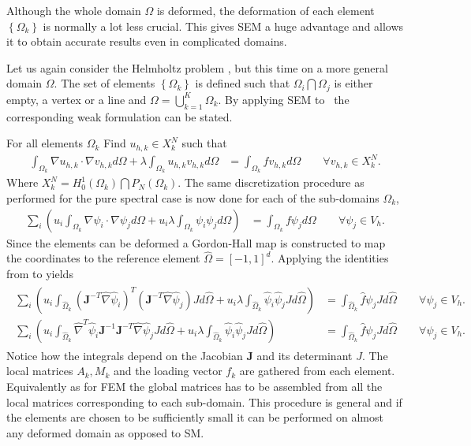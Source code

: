 Although the whole domain $\Omega$ is deformed, the deformation of each
element $\left\{ \Omega_k \right\}$ is normally a lot less crucial. This gives SEM a huge advantage and allows it to 
obtain accurate results even in complicated domains.

Let us again consider the Helmholtz problem , but this time 
on a more general domain $\Omega$. The set of elements $\left\{ \Omega_k \right\}$
is defined such that $\Omega_i\bigcap\Omega_j$ is either empty, a vertex or a line and 
$\Omega = \bigcup^K_{k=1}\Omega_k$.
By applying SEM to~ the corresponding weak formulation can be stated.

For all elements $\Omega_k$ Find $u_{h,k}\in X^N_k$  such that
%
\begin{align}
    \int_{\Omega_k}\nabla u_{h,k} \cdot \nabla v_{h,k} d \Omega
    + \lambda \int_{\Omega_k} u_{h,k} v_{h,k} d \Omega 
    &= \int_{\Omega_k}f v_{h,k}d \Omega \qquad \forall v_{h,k} \in X_k^N.
    \label{eq:HelmholtzweakSEM}
\end{align}
%
Where $X^N_k =  H_0^1(\Omega_k)\bigcap P_N(\Omega_k)$. The same discretization 
procedure as performed for the pure spectral case is now done for each of the 
sub-domains $\Omega_k$,
%
\begin{align}
    \sum_i\left(  u_i\int_{\Omega_k}\nabla \psi_i \cdot \nabla \psi_j d \Omega + 
    u_i\lambda \int_{\Omega_k} \psi_i \psi_jd \Omega \right)
    &= \int_{\Omega_k}f \psi_jd \Omega \qquad \forall \psi_j \in V_h.
    \label{eq:HelmholtzdiscreteSEM}
\end{align}
%
Since the elements can be deformed a Gordon-Hall map is 
constructed to map the coordinates to the reference element $\hat{\Omega}=[-1,1]^d$.
Applying the identities from  to  yields
%
\begin{align}
    \begin{split}
    \sum_i\left(  u_i\int_{\hat{\Omega}_k}(\mathbf{J}^{-T}\hat{\nabla} \hat{\psi}_i)^T
    (\mathbf{J}^{-T}\hat{\nabla} \hat{\psi}_j) J d \hat{\Omega} + 
    u_i\lambda \int_{\hat{\Omega}_k} \hat{\psi}_i \hat{\psi}_j Jd \hat{\Omega} \right)
    &= \int_{\hat{\Omega}_k}\hat{f} \psi_j J d \hat{\Omega} \qquad \forall \psi_j \in V_h.  \\
    \sum_i\left(  u_i\int_{\hat{\Omega}_k}\hat{\nabla}^T \hat{\psi}_i\mathbf{J}^{-1}
    \mathbf{J}^{-T}\hat{\nabla} \hat{\psi}_j J d \hat{\Omega} + 
    u_i\lambda \int_{\hat{\Omega}_k} \hat{\psi}_i \hat{\psi}_j Jd \hat{\Omega} \right)
    &= \int_{\hat{\Omega}_k}\hat{f} \psi_j J d \hat{\Omega} \qquad \forall \psi_j \in V_h.
    \end{split}
    \label{eq:HelmholtzrefSEM}
\end{align}
%
Notice how the integrals depend on the Jacobian $\mathbf{J}$ and its determinant $J$.
The local matrices $A_k,M_k$ and the loading vector $f_k$ are gathered from each element.
Equivalently as for FEM the global matrices has to be assembled
from all the local matrices corresponding to each sub-domain. This procedure is general and 
if the elements are chosen to be sufficiently small it can 
be performed on almost any deformed domain as opposed to SM. 

